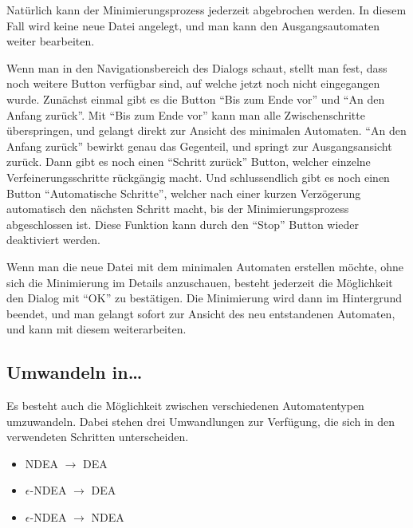   Natürlich kann der Minimierungsprozess jederzeit abgebrochen werden. In diesem
  Fall wird keine neue Datei angelegt, und man kann den Ausgangsautomaten weiter
  bearbeiten. \vspace{10pt}
  
  Wenn man in den Navigationsbereich des Dialogs schaut, stellt man fest, dass
  noch weitere Button verfügbar sind, auf welche jetzt noch nicht eingegangen
  wurde. Zunächst einmal gibt es die Button "`Bis zum Ende vor"' und "`An den
  Anfang zurück"'. Mit "`Bis zum Ende vor"' kann man alle Zwischenschritte
  überspringen, und gelangt direkt zur Ansicht des minimalen Automaten. "`An den
  Anfang zurück"' bewirkt genau das Gegenteil, und springt zur Ausgangsansicht
  zurück. Dann gibt es noch einen "`Schritt zurück"' Button, welcher einzelne
  Verfeinerungsschritte rückgängig macht. Und schlussendlich gibt es noch einen
  Button "`Automatische Schritte"', welcher nach einer kurzen Verzögerung
  automatisch den nächsten Schritt macht, bis der Minimierungsprozess
  abgeschlossen ist. Diese Funktion kann durch den "`Stop"' Button wieder
  deaktiviert werden.\vspace{10pt}
  
  Wenn man die neue Datei mit dem minimalen Automaten erstellen möchte, ohne sich
  die Minimierung im Details anzuschauen, besteht jederzeit die Möglich\-keit den
  Dialog mit "`OK"' zu bestätigen. Die Minimierung wird dann im Hintergrund
  beendet, und man gelangt sofort zur Ansicht des neu entstandenen Automaten, und
  kann mit diesem weiterarbeiten.
  
  
\subsection{Umwandeln in\ldots}\label{ConvertTo}
  
Es besteht auch die Möglichkeit zwischen verschiedenen Automatentypen
umzuwandeln. Dabei stehen drei Umwandlungen zur Verfügung, die sich in den
verwendeten Schritten unterscheiden.

\begin{itemize}
  \item NDEA $\to$ DEA
  \item $\epsilon$-NDEA $\to$ DEA
  \item $\epsilon$-NDEA $\to$ NDEA
\end{itemize}

